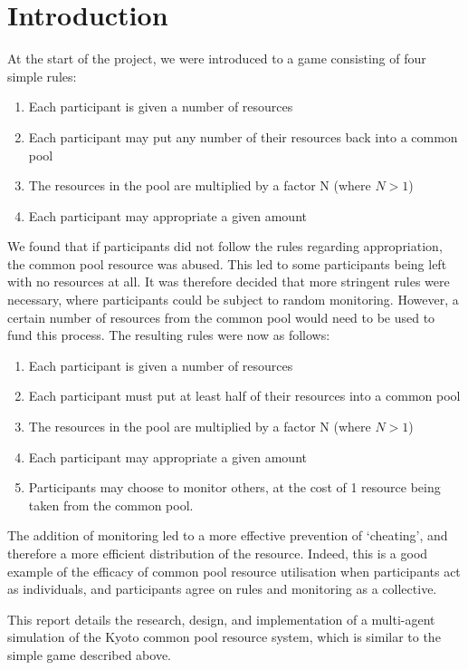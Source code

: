 \section{Introduction}

At the start of the project, we were introduced to a game consisting of four simple rules:

\begin{enumerate}
\item Each participant is given a number of resources
\item Each participant may put any number of their resources back into a common pool
\item	The resources in the pool are multiplied by a factor N (where $N > 1$)
\item	Each participant may appropriate a given amount
\end{enumerate}

We found that if participants did not follow the rules regarding appropriation, the common pool resource was abused. This led to some participants being left with no resources at all. It was therefore decided that more stringent rules were necessary, where participants could be subject to random monitoring. However, a certain number of resources from the common pool would need to be used to fund this process. The resulting rules were now as follows:

\begin{enumerate}
	\item Each participant is given a number of resources
	\item Each participant must put at least half of their resources into a common pool
	\item The resources in the pool are multiplied by a factor N (where $N > 1$)
	\item Each participant may appropriate a given amount
	\item Participants may choose to monitor others, at the cost of 1 resource being taken from the common pool.
\end{enumerate}

The addition of monitoring led to a more effective prevention of `cheating', and therefore a more efficient distribution of the resource. Indeed, this is a good example of the efficacy of common pool resource utilisation when participants act as individuals, and participants agree on rules and monitoring as a collective.

This report details the research, design, and implementation of a multi-agent simulation of the Kyoto common pool resource system, which is similar to the simple game described above.

